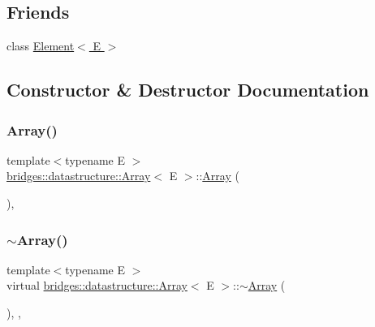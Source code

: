\subsection*{Friends}
\begin{DoxyCompactItemize}
\item 
class \hyperlink{classbridges_1_1datastructure_1_1_array_a8c6ff2a8dd3e27346dd25f588a78828a}{Element$<$ E $>$}
\end{DoxyCompactItemize}


\subsection{Constructor \& Destructor Documentation}
\mbox{\label{classbridges_1_1datastructure_1_1_array_a23cb659c4f39e5e6f3b29a58e97b8e0d}} 
\subsubsection{\texorpdfstring{Array()}{Array()}\hspace{0.1cm}{\footnotesize\ttfamily [1/3]}}
{\footnotesize\ttfamily template$<$typename E $>$ \\
\hyperlink{classbridges_1_1datastructure_1_1_array}{bridges\+::datastructure\+::\+Array}$<$ E $>$\+::\hyperlink{classbridges_1_1datastructure_1_1_array}{Array} (\begin{DoxyParamCaption}{ }\end{DoxyParamCaption})\hspace{0.3cm}{\ttfamily [inline]}, {\ttfamily [protected]}}

\mbox{\label{classbridges_1_1datastructure_1_1_array_a5a9f212f560e9673259eece27d8f11cc}} 
\subsubsection{\texorpdfstring{$\sim$\+Array()}{~Array()}}
{\footnotesize\ttfamily template$<$typename E $>$ \\
virtual \hyperlink{classbridges_1_1datastructure_1_1_array}{bridges\+::datastructure\+::\+Array}$<$ E $>$\+::$\sim$\hyperlink{classbridges_1_1datastructure_1_1_array}{Array} (\begin{DoxyParamCaption}{ }\end{DoxyParamCaption})\hspace{0.3cm}{\ttfamily [inline]}, {\ttfamily [protected]}, {\ttfamily [virtual]}}

